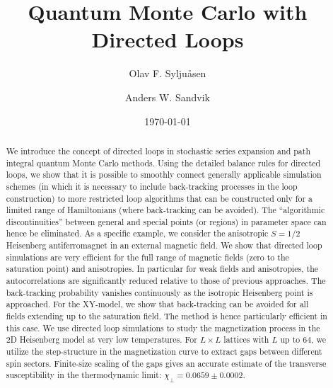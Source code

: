 \documentclass[10pt,pre,aps,twocolumn,showpacs,superscriptaddress,
floatfix]{revtex4}
\begin{document}
\title{Quantum Monte Carlo with Directed Loops}

\author{Olav F. Sylju{\aa}sen}

\author{Anders W. Sandvik}

\date{\today}



\begin{abstract}
We introduce the concept of directed loops in stochastic series expansion and 
path integral quantum Monte Carlo methods. Using the detailed balance rules 
for directed loops, we show that it is possible to smoothly connect generally 
applicable simulation schemes (in which it is necessary to include 
back-tracking processes in the loop construction) to more restricted loop 
algorithms that can be constructed only for a limited range of Hamiltonians
(where back-tracking can be avoided). The ``algorithmic discontinuities'' 
between general and special points (or regions) in parameter space can hence 
be eliminated. As a specific example, we consider the anisotropic $S=1/2$
Heisenberg antiferromagnet in an external magnetic field. We show that 
directed loop simulations are very efficient for the full range of magnetic 
fields (zero to the saturation point) and anisotropies. In particular for 
weak fields and anisotropies, the autocorrelations are significantly reduced 
relative to those of previous approaches. The back-tracking probability 
vanishes continuously as the isotropic Heisenberg point is approached. For 
the XY-model, we show that back-tracking can be avoided for all fields 
extending up to the saturation field. The method is hence particularly 
efficient in this case. We use directed loop simulations to study the 
magnetization process in the 2D Heisenberg model at very low temperatures. 
For $L\times L$ lattices with $L$ up to $64$, we utilize the step-structure
in the magnetization curve to extract gaps between different spin sectors.
Finite-size scaling of the gaps gives an accurate estimate of the 
transverse susceptibility in the thermodynamic limit: 
$\chi_\perp = 0.0659 \pm 0.0002$.
\end{abstract}

\maketitle
\end{document}
